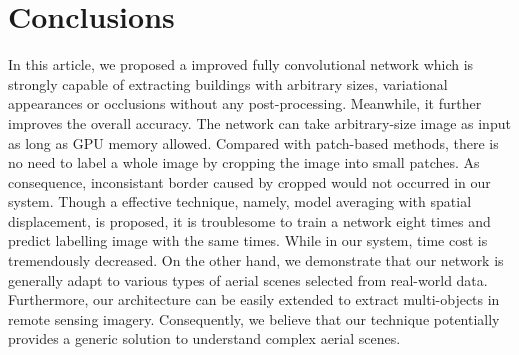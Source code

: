 \documentclass[runningheads]{llncs}
\begin{document}
\section{Conclusions}
\label{section:conclusions}
   In  this article, we proposed a improved fully convolutional network which is strongly capable of extracting buildings with arbitrary sizes, variational appearances or occlusions without any post-processing. Meanwhile, it further improves the overall accuracy. The network can take arbitrary-size image as input as long as GPU memory allowed. Compared with patch-based methods, there is no need to label a whole image by cropping the image into small patches. As consequence, inconsistant border caused by cropped would not occurred in our system. Though a effective technique\cite{Saito2016Multiple}, namely, model averaging with spatial displacement, is proposed, it is troublesome to train a network eight times and predict labelling image with the same times. While in our system, time cost is tremendously decreased. On the other hand, we demonstrate that our network  is generally adapt to various types of aerial scenes selected from real-world data. Furthermore, our architecture can be easily extended to extract multi-objects in remote sensing imagery. Consequently, we believe that our technique potentially provides a generic solution to understand complex aerial scenes.
	



\end{document}
